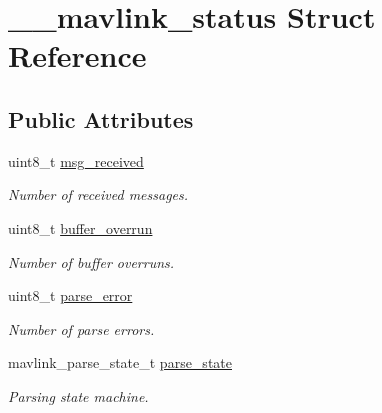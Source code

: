 \hypertarget{struct____mavlink__status}{}\section{\+\_\+\+\_\+mavlink\+\_\+status Struct Reference}
\label{struct____mavlink__status}
\subsection*{Public Attributes}
\begin{DoxyCompactItemize}
\item 
\mbox{\label{struct____mavlink__status_a183576e45facc9da8123b7866d458680}} 
uint8\+\_\+t \hyperlink{struct____mavlink__status_a183576e45facc9da8123b7866d458680}{msg\+\_\+received}
\begin{DoxyCompactList}\small\item\em Number of received messages. \end{DoxyCompactList}\item 
\mbox{\label{struct____mavlink__status_ae0ceb5a136021ee78c953f2e86d772cb}} 
uint8\+\_\+t \hyperlink{struct____mavlink__status_ae0ceb5a136021ee78c953f2e86d772cb}{buffer\+\_\+overrun}
\begin{DoxyCompactList}\small\item\em Number of buffer overruns. \end{DoxyCompactList}\item 
\mbox{\label{struct____mavlink__status_ae7a52aa0c84929dbf181220c689f9ec8}} 
uint8\+\_\+t \hyperlink{struct____mavlink__status_ae7a52aa0c84929dbf181220c689f9ec8}{parse\+\_\+error}
\begin{DoxyCompactList}\small\item\em Number of parse errors. \end{DoxyCompactList}\item 
\mbox{\label{struct____mavlink__status_aaf6742a61bbc641a4600184b3260fa0f}} 
mavlink\+\_\+parse\+\_\+state\+\_\+t \hyperlink{struct____mavlink__status_aaf6742a61bbc641a4600184b3260fa0f}{parse\+\_\+state}
\begin{DoxyCompactList}\small\item\em Parsing state machine. \end{DoxyCompactList}\item 

\end{DoxyCompactItemize}
